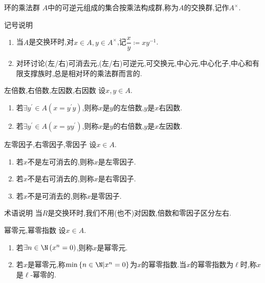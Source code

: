 \begin{definition}{环的乘法群}{}
	$A$中的可逆元组成的集合按乘法构成群,称为$A$的交换群,记作$A^{\times}$.
\end{definition}

\begin{remark}{记号说明}{}
	\begin{enumerate}
		\item 当$A$是交换环时,对$x\in A,y\in A^{\times}$,记$\dfrac{x}{y}\coloneq xy^{-1}$.
		\item 对环讨论(左/右)可消去元,(左/右)可逆元,可交换元,中心元,中心化子,中心和有限支撑族时,总是相对环的乘法群而言的.
	\end{enumerate}
\end{remark}

\begin{definition}{左倍数,右倍数,左因数,右因数}{}
	设$x,y\in A$.
	\begin{enumerate}
		\item 若$\exists y^{\prime}\in A\left(x=y^{\prime}y\right)$,则称$x$是$y$的左倍数,$y$是$x$右因数.
		\item 若$\exists y^{\prime}\in A\left(x=yy^{\prime}\right)$,则称$x$是$y$的右倍数,$y$是$x$左因数.
	\end{enumerate}
\end{definition}

\begin{definition}{左零因子,右零因子,零因子}{}
	设$x\in A$.
	\begin{enumerate}
		\item 若$x$不是左可消去的,则称$x$是左零因子.
		\item 若$x$不是右可消去的,则称$x$是右零因子.
		\item 若$x$不是可消去的,则称$x$是零因子.
	\end{enumerate}
\end{definition}

\begin{remark}{术语说明}{}
	当$R$是交换环时,我们不用(也不)对因数,倍数和零因子区分左右.
\end{remark}

\begin{definition}{幂零元,幂零指数}{}
	设$x\in A$.
	\begin{enumerate}
		\item 若$\exists n\in\N\left(x^{n}=0\right)$,则称$x$是幂零元.
		\item 若$x$是幂零元,称$\min\left\{n\in\N\middle|x^{n}=0\right\}$为$x$的幂零指数.当$x$的幂零指数为$\ell$时,称$x$是$\ell$-幂零的.
	\end{enumerate}
\end{definition}

